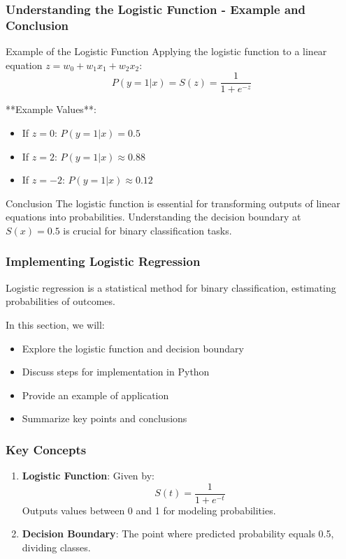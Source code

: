 \documentclass[aspectratio=169]{beamer}
\begin{document}
\begin{frame}[fragile]
    \frametitle{Understanding the Logistic Function - Example and Conclusion}

    \begin{block}{Example of the Logistic Function}
        Applying the logistic function to a linear equation \( z = w_0 + w_1x_1 + w_2x_2 \):
        \[
        P(y=1|x) = S(z) = \frac{1}{1 + e^{-z}}
        \]
        
        **Example Values**:
        \begin{itemize}
            \item If \( z = 0 \): \( P(y=1|x) = 0.5 \)
            \item If \( z = 2 \): \( P(y=1|x) \approx 0.88 \)
            \item If \( z = -2 \): \( P(y=1|x) \approx 0.12 \)
        \end{itemize}
    \end{block}

    \begin{block}{Conclusion}
        The logistic function is essential for transforming outputs of linear equations into probabilities. Understanding the decision boundary at \( S(x) = 0.5 \) is crucial for binary classification tasks.
    \end{block}
\end{frame}

\begin{frame}
    \frametitle{Implementing Logistic Regression}
    Logistic regression is a statistical method for binary classification, estimating probabilities of outcomes.

    In this section, we will:
    \begin{itemize}
        \item Explore the logistic function and decision boundary
        \item Discuss steps for implementation in Python
        \item Provide an example of application
        \item Summarize key points and conclusions
    \end{itemize}
\end{frame}

\begin{frame}
    \frametitle{Key Concepts}
    \begin{enumerate}
        \item \textbf{Logistic Function}: Given by:
        \begin{equation}
        S(t) = \frac{1}{1 + e^{-t}}
        \end{equation}
        Outputs values between 0 and 1 for modeling probabilities.
        
        \item \textbf{Decision Boundary}: The point where predicted probability equals 0.5, dividing classes.
    \end{enumerate}
\end{frame}
\end{document}
